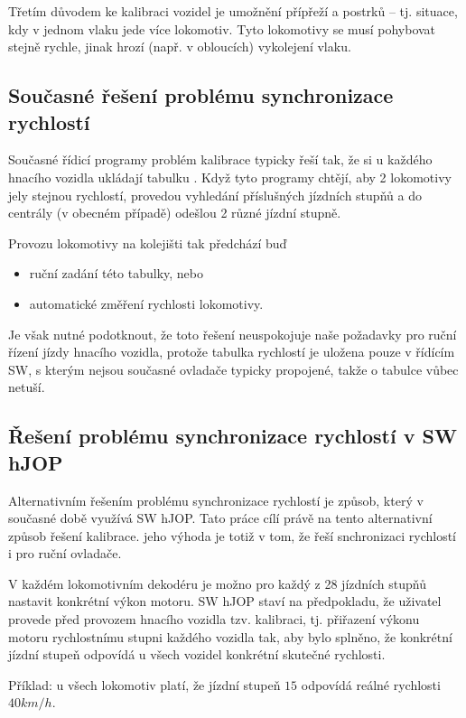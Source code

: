 Třetím důvodem ke kalibraci vozidel je umožnění přípřeží a postrků -- tj.
situace, kdy v jednom vlaku jede více lokomotiv. Tyto lokomotivy se musí
pohybovat stejně rychle, jinak hrozí (např. v obloucích) vykolejení vlaku.

\subsection{Současné řešení problému synchronizace rychlostí}

Současné řídicí programy problém kalibrace typicky řeší tak, že si u každého
hnacího vozidla ukládají tabulku .
Když tyto programy chtějí, aby 2 lokomotivy jely stejnou rychlostí, provedou
vyhledání příslušných jízdních stupňů a do centrály (v obecném případě)
odešlou 2 různé jízdní stupně.

Provozu lokomotivy na kolejišti tak předchází buď

\begin{itemize}
	\item ruční zadání této tabulky, nebo
	\item automatické změření rychlosti lokomotivy.
\end{itemize}

Je však nutné podotknout, že toto řešení neuspokojuje naše požadavky pro
ruční řízení jízdy hnacího vozidla, protože tabulka rychlostí je uložena
pouze v řídícím SW, s kterým nejsou současné ovladače typicky propojené, takže
o tabulce vůbec netuší.

\subsection{Řešení problému synchronizace rychlostí v SW hJOP}

Alternativním řešením problému synchronizace rychlostí je způsob, který
v současné době využívá SW hJOP. Tato práce cílí právě na tento alternativní
způsob řešení kalibrace. jeho výhoda je totiž v tom, že řeší snchronizaci
rychlostí i pro ruční ovladače.

V každém lokomotivním dekodéru je možno pro každý z 28 jízdních stupňů nastavit
konkrétní výkon motoru. SW hJOP staví na předpokladu, že uživatel provede
před provozem hnacího vozidla tzv. kalibraci, tj. přiřazení výkonu motoru
rychlostnímu stupni každého vozidla tak, aby bylo splněno, že konkrétní
jízdní stupeň odpovídá u všech vozidel konkrétní skutečné rychlosti.

Příklad: u všech lokomotiv platí, že jízdní stupeň $15$ odpovídá reálné rychlosti
$40 km/h$.

